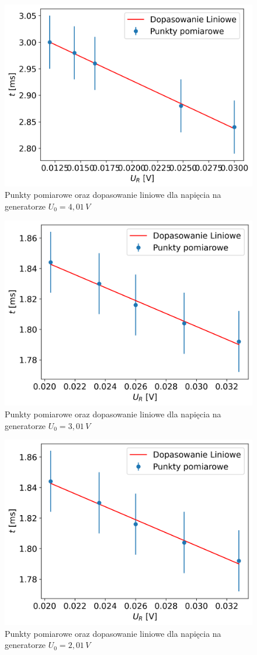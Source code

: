 \documentclass[12pt]{article}
\begin{document}
\begin{figure}[H]
    \centering
    \includegraphics[scale=0.58]{nachylenie_7}
    \caption{Punkty pomiarowe oraz dopasowanie liniowe dla napięcia na generatorze $U_0 = 4{,}01 \, V$}
\end{figure}
\begin{figure}[H]
    \centering
    \includegraphics[scale=0.58]{nachylenie_8}
    \caption{Punkty pomiarowe oraz dopasowanie liniowe dla napięcia na generatorze $U_0 = 3{,}01 \, V$}
\end{figure}
\begin{figure}[H]
    \centering
    \includegraphics[scale=0.58]{nachylenie_8}
    \caption{Punkty pomiarowe oraz dopasowanie liniowe dla napięcia na generatorze $U_0 = 2{,}01 \, V$}
\end{figure}
\end{document}
